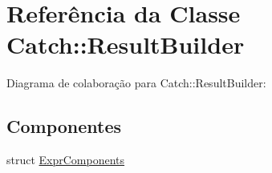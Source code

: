 \hypertarget{classCatch_1_1ResultBuilder}{}\section{Referência da Classe Catch\+:\+:Result\+Builder}
\label{classCatch_1_1ResultBuilder}


Diagrama de colaboração para Catch\+:\+:Result\+Builder\+:
\subsection*{Componentes}
\begin{DoxyCompactItemize}
\item 
struct \hyperlink{structCatch_1_1ResultBuilder_1_1ExprComponents}{Expr\+Components}
\end{DoxyCompactItemize}
